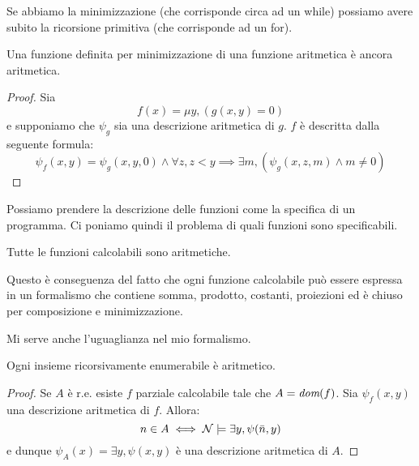Se abbiamo la minimizzazione (che corrisponde circa ad un while) possiamo avere subito la ricorsione
primitiva (che corrisponde ad un for).

\begin{lem}
    Una funzione definita per minimizzazione di una funzione aritmetica è ancora aritmetica.
\end{lem}
\begin{proof}
    Sia
    \begin{equation*}
        f(x) = \mu y, (g(x,y)=0)
    \end{equation*}
    e supponiamo che $\psi_{g}$ sia una descrizione aritmetica di $g$. $f$ è descritta dalla
    seguente formula:
    \begin{equation*}
        \psi_{f}(x,y) = \psi_{g}(x,y,0) \land \forall z, z < y \implies \exists m, (\psi_{g}(x,z,m)
        \land m \not= 0)
    \end{equation*}
\end{proof}

Possiamo prendere la descrizione delle funzioni come la specifica di un programma. Ci poniamo quindi
il problema di quali funzioni sono specificabili.

\begin{thm}
    Tutte le funzioni calcolabili sono aritmetiche.    
\end{thm}

Questo è conseguenza del fatto che ogni funzione calcolabile può essere espressa in un formalismo che
contiene somma, prodotto, costanti, proiezioni ed è chiuso per composizione e minimizzazione.

Mi serve anche l'uguaglianza nel mio formalismo.

\begin{thm}
    Ogni insieme ricorsivamente enumerabile è aritmetico.
\end{thm}
\begin{proof}
    Se $A$ è r.e. esiste $f$ parziale calcolabile tale che $A = \textit{dom}(f)$. Sia $\psi_{f}(x,y)$ una
    descrizione aritmetica di $f$. Allora:
    \begin{equation*}
        n \in A \iff \mathcal{N} \models \exists y, \psi(\bar{n},y)
    \end{equation*}
    e dunque $\psi_{A}(x) = \exists y, \psi(x,y)$ è una descrizione aritmetica di $A$.
\end{proof}

